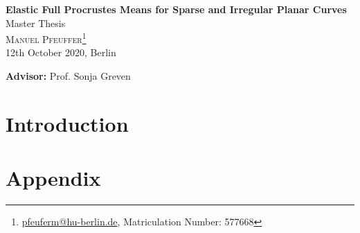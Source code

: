 \documentclass[a4paper,12pt]{article}
\begin{document}
\begin{titlepage}

  \begin{center}
  {\LARGE\textbf{Elastic Full Procrustes Means for Sparse and Irregular Planar Curves}}
  \vspace{0.7cm}\\
  {\large Master Thesis}
  \vspace{0.7cm}\\
  \textsc{Manuel Pfeuffer\footnote{\url{pfeuferm@hu-berlin.de}, Matriculation Number: 577668}}
  \vspace{0.1cm}\\
  12th October 2020, Berlin
  \vspace{1cm}\\

  \vfill
  \end{center}

  \noindent \textbf{Advisor:} Prof. Sonja Greven
  \vspace{0.5em}

\end{titlepage}


\tableofcontents
\newpage


\section{Introduction}
\label{sec:intro}



\appendix
\newpage
\section{Appendix}
\label{app}



\newpage
\nocite{*}
\printbibliography[heading=bibintoc] %
\end{document}
